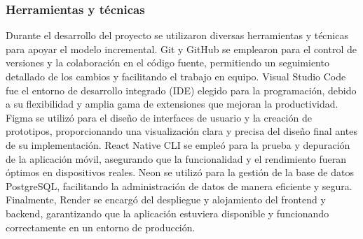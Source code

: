 \subsubsection{Herramientas y técnicas}

Durante el desarrollo del proyecto se utilizaron diversas herramientas y técnicas para apoyar el modelo incremental. Git y GitHub se emplearon para el control de versiones y la colaboración en el código fuente, permitiendo un seguimiento detallado de los cambios y facilitando el trabajo en equipo. Visual Studio Code fue el entorno de desarrollo integrado (IDE) elegido para la programación, debido a su flexibilidad y amplia gama de extensiones que mejoran la productividad. Figma se utilizó para el diseño de interfaces de usuario y la creación de prototipos, proporcionando una visualización clara y precisa del diseño final antes de su implementación. React Native CLI se empleó para la prueba y depuración de la aplicación móvil, asegurando que la funcionalidad y el rendimiento fueran óptimos en dispositivos reales. Neon se utilizó para la gestión de la base de datos PostgreSQL, facilitando la administración de datos de manera eficiente y segura. Finalmente, Render se encargó del despliegue y alojamiento del frontend y backend, garantizando que la aplicación estuviera disponible y funcionando correctamente en un entorno de producción.